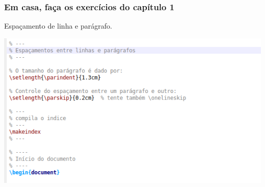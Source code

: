 \documentclass{beamer}
\begin{document}
\begin{frame}

  \frametitle{Em casa, faça os exercícios do capítulo 1}

  Espaçamento de linha e parágrafo.

  \begin{center}
    \includegraphics[scale=0.40] {../Imagens/ST5.png}
  \end{center}


\end{frame}
\end{document}
